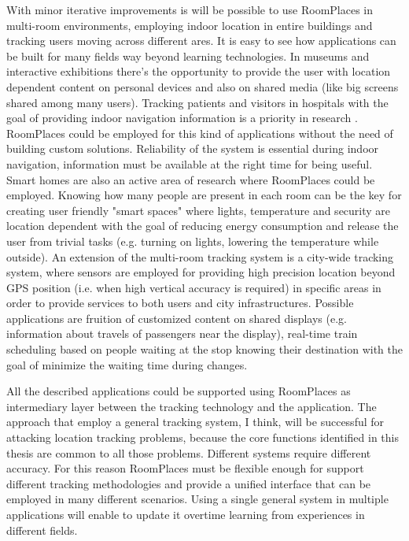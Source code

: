 With minor iterative improvements is will be possible to use RoomPlaces in multi-room environments, employing indoor location in entire buildings and tracking users moving across different ares. It is easy to see how applications can be built for many fields way beyond learning technologies. In museums and interactive exhibitions there's the opportunity to provide the user with location dependent content on personal devices and also on shared media (like big screens shared among many users). Tracking patients and visitors in hospitals with the goal of providing indoor navigation information is a priority in research \cite{yang:ibeacon}. RoomPlaces could be employed for this kind of applications without the need of building custom solutions. Reliability of the system is essential during indoor navigation, information must be available at the right time for being useful. Smart homes are also an active area of research where RoomPlaces could be employed. Knowing how many people are present in each room can be the key for creating user friendly "smart spaces" where lights, temperature and security are location dependent with the goal of reducing energy consumption and release the user from trivial tasks (e.g. turning on lights, lowering the temperature while outside). An extension of the multi-room tracking system is a city-wide tracking system, where sensors are employed for providing high precision location beyond GPS position (i.e. when high vertical accuracy is required) in specific areas in order to provide services to both users and city infrastructures. Possible applications are fruition of customized content on shared displays (e.g. information about travels of passengers near the display), real-time train scheduling based on people waiting at the stop knowing their destination with the goal of minimize the waiting time during changes.

All the described applications could be supported using RoomPlaces as intermediary layer between the tracking technology and the application. The approach that employ a general tracking system, I think, will be successful for attacking location tracking problems, because the core functions identified in this thesis are common to all those problems. Different systems require different accuracy. For this reason RoomPlaces must be flexible enough for support different tracking methodologies and provide a unified interface that can be employed in many different scenarios. Using a single general system in multiple applications will enable to update it overtime learning from experiences in different fields.